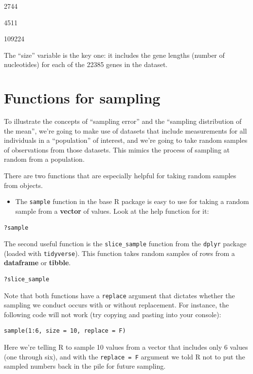 \documentclass[
]{book}
\providecommand{\tightlist}{%
  \setlength{\itemsep}{0pt}\setlength{\parskip}{0pt}}
\begin{document}
2744

4511

109224

The ``size'' variable is the key one: it includes the gene lengths (number of nucleotides) for each of the 22385 genes in the dataset.

\section{Functions for sampling}\label{sampling_functions}

To illustrate the concepts of ``sampling error'' and the ``sampling distribution of the mean'', we're going to make use of datasets that include measurements for all individuals in a ``population'' of interest, and we're going to take random samples of observations from those datasets. This mimics the process of sampling at random from a population.

There are two functions that are especially helpful for taking random samples from objects.

\begin{itemize}
\tightlist
\item
  The \texttt{sample} function in the base R package is easy to use for taking a random sample from a \textbf{vector} of values. Look at the help function for it:
\end{itemize}

\begin{verbatim}
?sample
\end{verbatim}

The second useful function is the \texttt{slice\_sample} function from the \texttt{dplyr} package (loaded with \texttt{tidyverse}). This function takes random samples of rows from a \textbf{dataframe} or \textbf{tibble}.

\begin{verbatim}
?slice_sample
\end{verbatim}

Note that both functions have a \texttt{replace} argument that dictates whether the sampling we conduct occurs with or without replacement. For instance, the following code will not work (try copying and pasting into your console):

\begin{verbatim}
sample(1:6, size = 10, replace = F)
\end{verbatim}

Here we're telling R to sample 10 values from a vector that includes only 6 values (one through six), and with the \texttt{replace\ =\ F} argument we told R not to put the sampled numbers back in the pile for future sampling.
\end{document}
